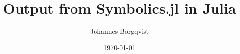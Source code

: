 \documentclass{article}
\begin{document}
\title{Output from Symbolics.jl in Julia}
\author{Johannes Borgqvist}
\date{\today}
\maketitle


\end{document}
